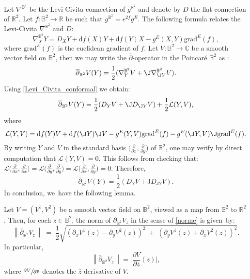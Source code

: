 Let $\nabla^{\mathbb{B}^2}$ be the Levi-Civita connection of $g^{\mathbb{B}^2}$ and denote by $D$ the flat connection of $\mathbb{R}^2$. Let $f:\mathbb{B}^2\to\mathbb{R}$ be such that $g^{\mathbb{B}^2}=e^{2f}g^E$. The following formula relates the Levi-Civita $\nabla^{\mathbb{B}^2}$ and $D$:
\begin{equation}\label{Levi_Civita_conformal}
\nabla^{\mathbb{B}^2}_XY=D_XY+\mathrm{d}f(X)Y+\mathrm{d}f(Y)X-g^E(X,Y)\mathrm{grad}^E(f),
\end{equation}
where $\mathrm{grad}^E(f)$ is the euclidean gradient of $f$. Let $V:\mathbb{B}^2\to\mathbb{C}$ be a smooth vector field on $\mathbb{B}^2$, then we may write the $\overline{\partial}$-operator in the Poincaré $\mathbb{B}^2$ as :
\begin{equation}\label{dbar_B2}
\overline{\partial}_{\mathbb{B}^2}V(Y)=\frac{1}{2}(\nabla^{\mathbb{B}^2}_YV+\J\nabla^{\mathbb{B}^2}_{\J Y}V).
\end{equation}
Using \eqref{Levi_Civita_conformal} we obtain:
\begin{equation}\label{eq_53}
\overline{\partial}_{\mathbb{B}^2}V(Y)=\frac{1}{2} (D_YV+\J D_{\J Y}V)+\frac{1}{2} \mathcal{L}(Y,V),
\end{equation}
where
\[
\mathcal{L}(Y,V)=\mathrm{d}f(Y)V+ \mathrm{d}f(\J Y)\J V-g^{E}(Y,V)\mathrm{grad}^E(f)-g^{E}(\J Y,V)\J\mathrm{grad}^E(f).
\]
By writing \(Y \) and \(V \) in the standard basis \(\bigl(\frac{\partial}{\partial x}, \frac{\partial}{\partial y}\bigr) \) of \(\mathbb{R}^2 \), one may verify by direct computation that \(\mathcal{L}(Y, V) = 0 \). This follows from checking that:
$
\mathcal{L}\bigl(\frac{\partial}{\partial x}, \frac{\partial}{\partial x} \bigr)
= \mathcal{L}\bigl(\frac{\partial}{\partial y}, \frac{\partial}{\partial y} \bigr)
= \mathcal{L}\bigl(\frac{\partial}{\partial x}, \frac{\partial}{\partial y} \bigr)
= 0
$.
Therefore,
\begin{equation}\label{dbar_relation0}
\overline{\partial}_{\mathbb{B}^2}V(Y)=\frac{1}{2}(D_YV + \mathrm{J} D_{\mathrm{J}Y}V).
\end{equation}
In conclusion, we~have the following lemma.

\begin{lemma}\label{same_d_bar}
Let \(V = (V^1, V^2) \) be a smooth vector field on \(\mathbb{B}^2 \), viewed as a map from \(\mathbb{B}^2 \) to \(\mathbb{R}^2 \). Then, for each \(z \!\in\! \mathbb{B}^2 \), the norm of \(\overline{\partial}_{\mathbb{B}^2}V_z \) in the sense of \eqref{norme} is given~by:
\[
\left\lVert\overline\partial_{\mathbb{B}^2}V_z\right\rVert
\;=\;
\frac{1}{2}
\sqrt{
\left(\partial_x V^1(z) - \partial_y V^2(z)\right)^2
\;+\;
\left(\partial_y V^1(z) + \partial_x V^2(z)\right)^2
}.
\]
In particular,
\begin{equation}\label{norme2}
\left\lVert \overline{\partial}_{\mathbb{B}^2} V_z \right\rVert = \biggl| \frac{\partial V}{\partial \overline{z}}(z) \biggr|,
\end{equation}
where \(\sfrac{\partial V}{\partial \overline{z}} \) denotes the \(\overline{z} \)-derivative of \(V \).
\end{lemma}

